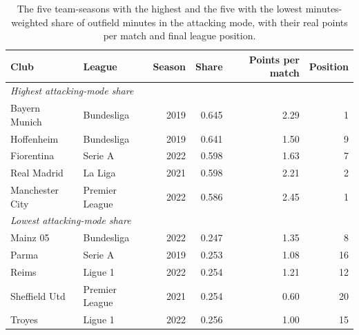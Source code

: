 \begin{table}[t]
\centering
\small
\caption{The five team-seasons with the highest and the five with the lowest minutes-weighted share of outfield minutes in the attacking mode, with their real points per match and final league position.}
\label{tab:outcomes}
\begin{tabular}{llrrrr}
\toprule
Club & League & Season & Share & Points per match & Position \\
\midrule
\multicolumn{6}{l}{\emph{Highest attacking-mode share}} \\
Bayern Munich & Bundesliga & 2019 & 0.645 & 2.29 & 1 \\
Hoffenheim & Bundesliga & 2019 & 0.641 & 1.50 & 9 \\
Fiorentina & Serie A & 2022 & 0.598 & 1.63 & 7 \\
Real Madrid & La Liga & 2021 & 0.598 & 2.21 & 2 \\
Manchester City & Premier League & 2022 & 0.586 & 2.45 & 1 \\
\multicolumn{6}{l}{\emph{Lowest attacking-mode share}} \\
Mainz 05 & Bundesliga & 2022 & 0.247 & 1.35 & 8 \\
Parma & Serie A & 2019 & 0.253 & 1.08 & 16 \\
Reims & Ligue 1 & 2022 & 0.254 & 1.21 & 12 \\
Sheffield Utd & Premier League & 2021 & 0.254 & 0.60 & 20 \\
Troyes & Ligue 1 & 2022 & 0.256 & 1.00 & 15 \\
\bottomrule
\end{tabular}
\end{table}
